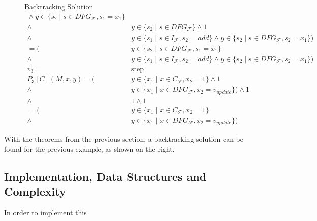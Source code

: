 \begin{figure}[p]
\begin{blackwhitebox}{Backtracking Solution}
\begin{align*}
                \mathrel\land   y\in\{s_2\mid s\in DFG_\mathcal{F},s_1=x_1\}\\
                \mathrel\land{}&y\in\{s_2\mid s\in DFG_\mathcal{F}\}
                \mathrel\land   1\\
                \mathrel\land{}&y\in\{s_1\mid s\in I_\mathcal{F},s_2=add\}
                \mathrel\land   y\in\{s_2\mid s\in DFG_\mathcal{F},s_2=x_1\})\\[1em]
                         =    (&y\in\{s_2\mid s\in DFG_\mathcal{F},s_1=x_1\}\\
                \mathrel\land{}&y\in\{s_1\mid s\in I_\mathcal{F},s_2=add\}
                \mathrel\land   y\in\{s_2\mid s\in DFG_\mathcal{F},s_2=x_1\})\\[1em]
            v_3={}&\text{step}\\
            P_3[C](M,x,y)=  ({}&y\in\{x_1\mid x\in C_\mathcal{F}, x_2=1\}
                \mathrel\land   1\\
                \mathrel\land{}&y\in\{x_1\mid x\in DFG_\mathcal{F}, x_2=v_{update}\})
                \mathrel\land   1\\
                \mathrel\land{}&1
                \mathrel\land   1\\[1em]
                         =  ({}&y\in\{x_1\mid x\in C_\mathcal{F}, x_2=1\}\\
                \mathrel\land{}&y\in\{x_1\mid x\in DFG_\mathcal{F}, x_2=v_{update}\})
        \end{align*}
    \end{blackwhitebox}
\end{figure}

    With the theorems from the previous section, a backtracking solution can
    be found for the previous example, as shown on the right.


\subsection{Implementation, Data Structures and Complexity}

    In order to implement this


